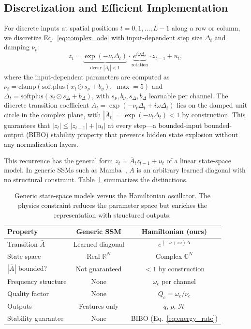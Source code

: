 \documentclass[11pt]{article}
\begin{document}
\subsection{Discretization and Efficient Implementation}

For discrete inputs at spatial positions $t = 0, 1, \ldots, L{-}1$ along a row or column, we discretize Eq.~\eqref{eq:complex_ode} with input-dependent step size $\Delta_t$ and damping $\nu_t$:
\begin{equation}
    z_t = \underbrace{\exp(-\nu_t\Delta_t)}_{\text{decay}\; |\bar{A}_t| < 1} \cdot \underbrace{e^{i\omega\Delta_t}}_{\text{rotation}} \cdot z_{t-1} + u_t,
    \label{eq:recurrence}
\end{equation}
where the input-dependent parameters are computed as $\nu_t = \text{clamp}(\text{softplus}(x_t \odot s_\nu + b_\nu),\; \max{=}5)$ and $\Delta_t = \text{softplus}(x_t \odot s_\Delta + b_\Delta)$, with $s_\nu, b_\nu, s_\Delta, b_\Delta$ learnable per channel. The discrete transition coefficient $\bar{A}_t = \exp(-\nu_t\Delta_t + i\omega\Delta_t)$ lies on the damped unit circle in the complex plane, with $|\bar{A}_t| = \exp(-\nu_t\Delta_t) < 1$ by construction. This guarantees that $|z_t| \leq |z_{t-1}| + |u_t|$ at every step---a bounded-input bounded-output (BIBO) stability property that prevents hidden state explosion without any normalization layers.

This recurrence has the general form $z_t = \bar{A}_t z_{t-1} + u_t$ of a linear state-space model. In generic SSMs such as Mamba~\cite{gu2023mamba}, $\bar{A}$ is an arbitrary learned diagonal with no structural constraint. Table~\ref{tab:ssm_comparison} summarizes the distinctions.

\begin{table}[t]
\centering
\caption{Generic state-space models versus the Hamiltonian oscillator. The physics constraint reduces the parameter space but enriches the representation with structured outputs.}
\label{tab:ssm_comparison}
\small
\begin{tabular}{@{}lcc@{}}
\toprule
Property & Generic SSM & Hamiltonian (ours) \\
\midrule
Transition $\bar{A}$ & Learned diagonal & $e^{(-\nu+i\omega)\Delta}$ \\
State space & Real $\mathbb{R}^N$ & Complex $\mathbb{C}^N$ \\
$|\bar{A}|$ bounded? & Not guaranteed & $< 1$ by construction \\
Frequency structure & None & $\omega_c$ per channel \\
Quality factor & None & $Q_c = \omega_c/\nu_c$ \\
Outputs & Features only & $q$, $p$, $\mathcal{H}$ \\
Stability guarantee & None & BIBO (Eq.~\ref{eq:energy_rate}) \\
\bottomrule
\end{tabular}
\end{table}
\end{document}
